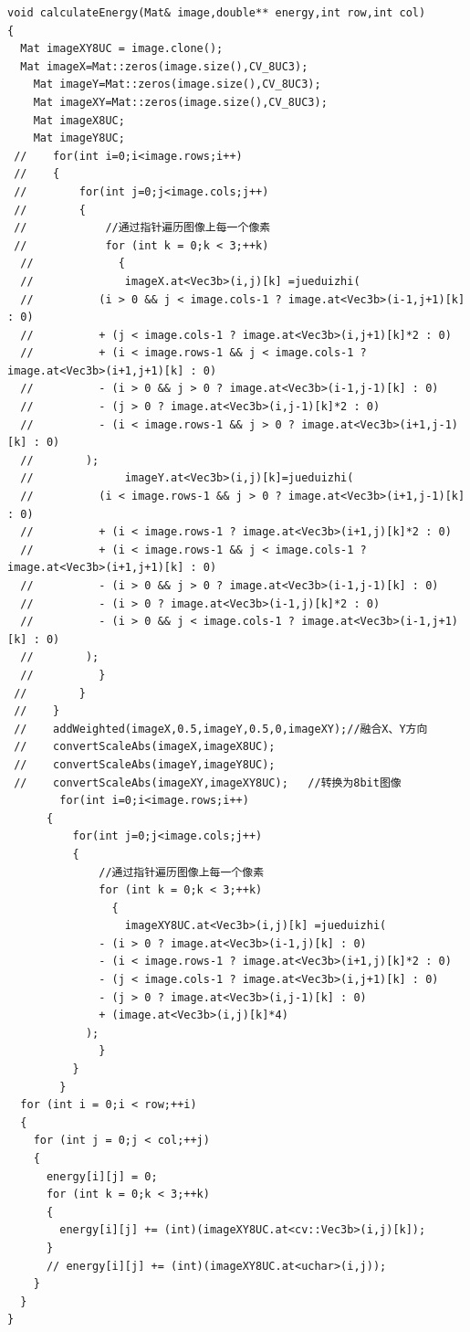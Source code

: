 \documentclass[10pt, a4paper]{article}
\begin{document}
        \begin{lstlisting}
void calculateEnergy(Mat& image,double** energy,int row,int col)
{
  Mat imageXY8UC = image.clone();    
  Mat imageX=Mat::zeros(image.size(),CV_8UC3);  
    Mat imageY=Mat::zeros(image.size(),CV_8UC3);     
    Mat imageXY=Mat::zeros(image.size(),CV_8UC3);    
    Mat imageX8UC;  
    Mat imageY8UC;  
 //    for(int i=0;i<image.rows;i++)  
 //    {  
 //        for(int j=0;j<image.cols;j++)  
 //        {  
 //            //通过指针遍历图像上每一个像素  
 //            for (int k = 0;k < 3;++k)
  //             {
  //              imageX.at<Vec3b>(i,j)[k] =jueduizhi(
  //          (i > 0 && j < image.cols-1 ? image.at<Vec3b>(i-1,j+1)[k] : 0)
  //          + (j < image.cols-1 ? image.at<Vec3b>(i,j+1)[k]*2 : 0)
  //          + (i < image.rows-1 && j < image.cols-1 ? image.at<Vec3b>(i+1,j+1)[k] : 0)
  //          - (i > 0 && j > 0 ? image.at<Vec3b>(i-1,j-1)[k] : 0)
  //          - (j > 0 ? image.at<Vec3b>(i,j-1)[k]*2 : 0)
  //          - (i < image.rows-1 && j > 0 ? image.at<Vec3b>(i+1,j-1)[k] : 0)
  //        );  
  //              imageY.at<Vec3b>(i,j)[k]=jueduizhi(
  //          (i < image.rows-1 && j > 0 ? image.at<Vec3b>(i+1,j-1)[k] : 0)
  //          + (i < image.rows-1 ? image.at<Vec3b>(i+1,j)[k]*2 : 0)
  //          + (i < image.rows-1 && j < image.cols-1 ? image.at<Vec3b>(i+1,j+1)[k] : 0)
  //          - (i > 0 && j > 0 ? image.at<Vec3b>(i-1,j-1)[k] : 0)
  //          - (i > 0 ? image.at<Vec3b>(i-1,j)[k]*2 : 0)
  //          - (i > 0 && j < image.cols-1 ? image.at<Vec3b>(i-1,j+1)[k] : 0)
  //        );  
  //          }
 //        }  
 //    }  
 //    addWeighted(imageX,0.5,imageY,0.5,0,imageXY);//融合X、Y方向    
 //    convertScaleAbs(imageX,imageX8UC);  
 //    convertScaleAbs(imageY,imageY8UC);  
 //    convertScaleAbs(imageXY,imageXY8UC);   //转换为8bit图像  
        for(int i=0;i<image.rows;i++)  
      {  
          for(int j=0;j<image.cols;j++)  
          {  
              //通过指针遍历图像上每一个像素  
              for (int k = 0;k < 3;++k)
                {
                  imageXY8UC.at<Vec3b>(i,j)[k] =jueduizhi(
              - (i > 0 ? image.at<Vec3b>(i-1,j)[k] : 0)
              - (i < image.rows-1 ? image.at<Vec3b>(i+1,j)[k]*2 : 0)
              - (j < image.cols-1 ? image.at<Vec3b>(i,j+1)[k] : 0)
              - (j > 0 ? image.at<Vec3b>(i,j-1)[k] : 0)
              + (image.at<Vec3b>(i,j)[k]*4)
            );  
              }
          }  
        }
  for (int i = 0;i < row;++i)
  {
    for (int j = 0;j < col;++j)
    {
      energy[i][j] = 0;
      for (int k = 0;k < 3;++k)
      {
        energy[i][j] += (int)(imageXY8UC.at<cv::Vec3b>(i,j)[k]);
      }
      // energy[i][j] += (int)(imageXY8UC.at<uchar>(i,j));
    }
  }
}
    \end{lstlisting}
\end{document}
